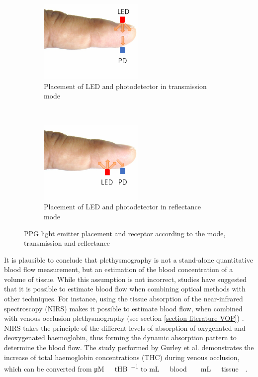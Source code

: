 \begin{figure}[!htbp]
	\centering
	\begin{subfigure}[t]{0.45\textwidth}
		\centering
		\includegraphics[height=4cm]{figure7a}
		\caption{Placement of LED and photodetector in transmission mode}
		\label{fig:PPG transmission}
	\end{subfigure}%
	~ 
	\begin{subfigure}[t]{0.45\textwidth}
		\centering
		\includegraphics[height=4cm]{figure7b}
		\caption{Placement of LED and photodetector in reflectance mode}
		\label{fig:PPG reflectance}
	\end{subfigure}
	\caption[PPG sensors placemens as transmission and reflectance modes]{PPG light emitter placement and receptor according to the mode, transmission and reflectance}
	\label{fig:PPG modes}
\end{figure}

It is plausible to conclude that plethysmography is not a stand-alone quantitative blood flow measurement, but an estimation of the blood concentration of a volume of tissue. While this assumption is not incorrect, studies have suggested that it is possible to estimate blood flow when combining optical methods with other techniques. For instance, using the tissue absorption of the near-infrared spectroscopy (NIRS) makes it possible to estimate blood flow, when combined with venous occlusion plethysmography (see section \ref{section literature VOP}) \cite{van2001performance, harel2008near, de1993noninvasive, gurley2012noninvasive}. NIRS takes the principle of the different levels of absorption of oxygenated and deoxygenated haemoglobin, thus forming the dynamic absorption pattern to determine the blood flow. The study performed by Gurley et al. demonstrates the increase of total haemoglobin concentrations (THC) during venous occlusion, which can be converted from \si{\micro M  \ tHB\per\sec} to \si{\mL \ blood  \ \mL \ tissue \per\min}.

